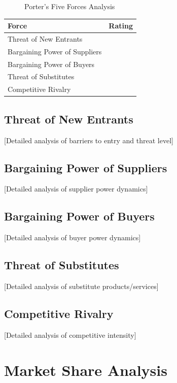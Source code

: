 \documentclass[11pt,letterpaper]{report}
\begin{document}
\begin{figure}[htbp]
\centering
\caption{Porter's Five Forces Analysis}
\label{fig:porter}
\end{figure}

\begin{porterbox}
\begin{tabular}{@{}ll@{}}
\textbf{Force} & \textbf{Rating} \\
\midrule
Threat of New Entrants & \riskmedium{} \\
Bargaining Power of Suppliers & \risklow{} \\
Bargaining Power of Buyers & \riskhigh{} \\
Threat of Substitutes & \risklow{} \\
Competitive Rivalry & \riskhigh{} \\
\end{tabular}
\end{porterbox}

\subsection{Threat of New Entrants}
[Detailed analysis of barriers to entry and threat level]

\subsection{Bargaining Power of Suppliers}
[Detailed analysis of supplier power dynamics]

\subsection{Bargaining Power of Buyers}
[Detailed analysis of buyer power dynamics]

\subsection{Threat of Substitutes}
[Detailed analysis of substitute products/services]

\subsection{Competitive Rivalry}
[Detailed analysis of competitive intensity]

\section{Market Share Analysis}
\end{document}
